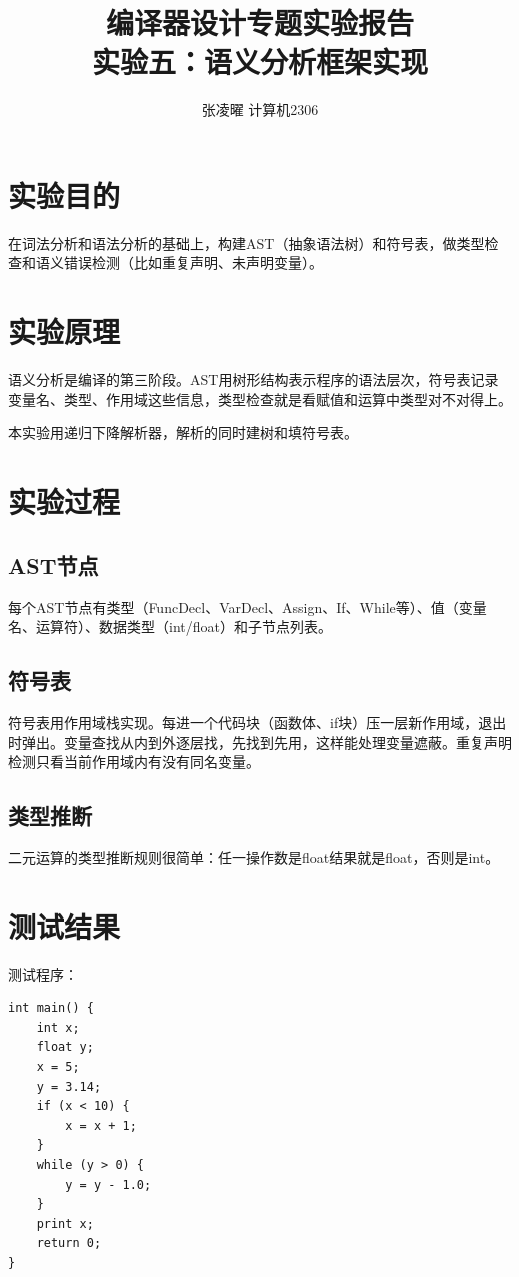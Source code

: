 \documentclass[12pt,a4paper]{ctexart}
\title{\textbf{编译器设计专题实验报告}\\[0.5em]\Large\color{themecolor}实验五：语义分析框架实现}
\author{张凌曜 \quad 2234214014 \quad 计算机2306}
\date{}
\begin{document}
\maketitle

\section{实验目的}
在词法分析和语法分析的基础上，构建AST（抽象语法树）和符号表，做类型检查和语义错误检测（比如重复声明、未声明变量）。

\section{实验原理}
语义分析是编译的第三阶段。AST用树形结构表示程序的语法层次，符号表记录变量名、类型、作用域这些信息，类型检查就是看赋值和运算中类型对不对得上。

本实验用递归下降解析器，解析的同时建树和填符号表。

\section{实验过程}

\subsection{AST节点}
每个AST节点有类型（FuncDecl、VarDecl、Assign、If、While等）、值（变量名、运算符）、数据类型（int/float）和子节点列表。

\subsection{符号表}
符号表用作用域栈实现。每进一个代码块（函数体、if块）压一层新作用域，退出时弹出。变量查找从内到外逐层找，先找到先用，这样能处理变量遮蔽。重复声明检测只看当前作用域内有没有同名变量。

\subsection{类型推断}
二元运算的类型推断规则很简单：任一操作数是float结果就是float，否则是int。

\section{测试结果}

测试程序：

\begin{lstlisting}[language={}]
int main() {
    int x;
    float y;
    x = 5;
    y = 3.14;
    if (x < 10) {
        x = x + 1;
    }
    while (y > 0) {
        y = y - 1.0;
    }
    print x;
    return 0;
}
\end{lstlisting}
\end{document}
